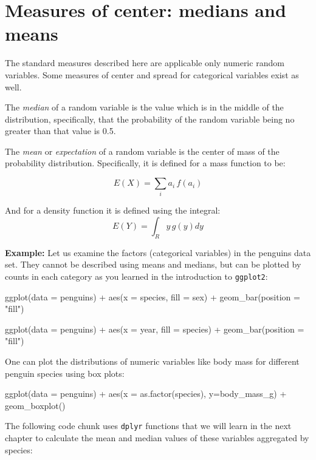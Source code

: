 \documentclass[
  letterpaper,
  DIV=11,
  numbers=noendperiod]{scrreprt}
\newenvironment{Shaded}{\begin{snugshade}}{\end{snugshade}}
\newcommand{\NormalTok}[1]{\textcolor[rgb]{0.00,0.23,0.31}{#1}}
\begin{document}
\section{Measures of center: medians and
means}\label{measures-of-center-medians-and-means}

The standard measures described here are applicable only numeric random
variables. Some measures of center and spread for categorical variables
exist as well.

The \emph{median} of a random variable is the value which is in the
middle of the distribution, specifically, that the probability of the
random variable being no greater than that value is 0.5.

The \emph{mean} or \emph{expectation} of a random variable is the center
of mass of the probability distribution. Specifically, it is defined for
a mass function to be:

\[ E(X) = \sum_i a_i\, f(a_i)\]

And for a density function it is defined using the integral:
\[ E(Y) =  \int_R y\, g(y) dy \]

\textbf{Example:} Let us examine the factors (categorical variables) in
the penguins data set. They cannot be described using means and medians,
but can be plotted by counts in each category as you learned in the
introduction to \texttt{ggplot2}:

\begin{Shaded}
\begin{Highlighting}[]
\NormalTok{ggplot(data = penguins) +}
\NormalTok{  aes(x = species, fill = sex) + }
\NormalTok{  geom\_bar(position = "fill")}


\NormalTok{ggplot(data = penguins) +}
\NormalTok{  aes(x = year, fill = species) + }
\NormalTok{  geom\_bar(position = "fill")}
\end{Highlighting}
\end{Shaded}

One can plot the distributions of numeric variables like body mass for
different penguin species using box plots:

\begin{Shaded}
\begin{Highlighting}[]
\NormalTok{ggplot(data = penguins) + aes(x = as.factor(species), y=body\_mass\_g) + geom\_boxplot()}
\end{Highlighting}
\end{Shaded}

The following code chunk uses \texttt{dplyr} functions that we will
learn in the next chapter to calculate the mean and median values of
these variables aggregated by species:
\end{document}
